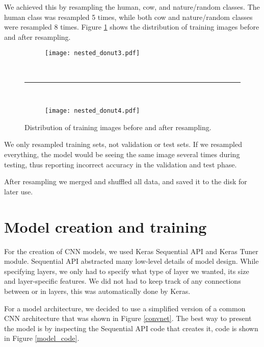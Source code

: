 
We achieved this by resampling the human, cow, and nature/random classes.
The human class was resampled 5 times, while both cow and nature/random classes were resampled 8 times.
Figure \ref{resampled} shows the distribution of training images before and after resampling.

\begin{figure}[ht] 
    \begin{subfigure}[b]{1\textwidth}
        \centering
        \texttt{[image: nested\_donut3.pdf]} 
    \end{subfigure}
    \unskip\ \hrule\ 
    \begin{subfigure}[b]{1\textwidth}
        \centering
        \texttt{[image: nested\_donut4.pdf]} 
    \end{subfigure}
    
    \caption{ Distribution of training images before and after resampling.}
    \label{resampled}
\end{figure}

We only resampled training sets, not validation or test sets.
If we resampled everything, the model would be seeing the same image several times during testing, thus reporting incorrect accuracy in the validation and test phase.

After resampling we merged and shuffled all data, and saved it to the disk for later use.

\newpage
\section{ Model creation and training}\label{cnn_ref}

For the creation of CNN models, we used Keras Sequential API and Keras Tuner module.
Sequential API abstracted many low-level details of model design.
While specifying layers, we only had to specify what type of layer we wanted, its size and layer-specific features. 
We did not had to keep track of any connections between or in layers, this was automatically done by Keras.

For a model architecture, we decided to use a simplified version of a common CNN architecture that was shown in Figure \ref{convnet}.
The best way to present the model is by inspecting the Sequential API code that creates it, code is shown in Figure \ref{model_code}.

